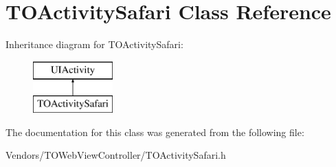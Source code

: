 \hypertarget{interface_t_o_activity_safari}{}\section{T\+O\+Activity\+Safari Class Reference}
\label{interface_t_o_activity_safari}
Inheritance diagram for T\+O\+Activity\+Safari\+:\begin{figure}[H]
\begin{center}
\leavevmode
\includegraphics[height=2.000000cm]{interface_t_o_activity_safari}
\end{center}
\end{figure}


The documentation for this class was generated from the following file\+:\begin{DoxyCompactItemize}
\item 
Vendors/\+T\+O\+Web\+View\+Controller/T\+O\+Activity\+Safari.\+h\end{DoxyCompactItemize}
